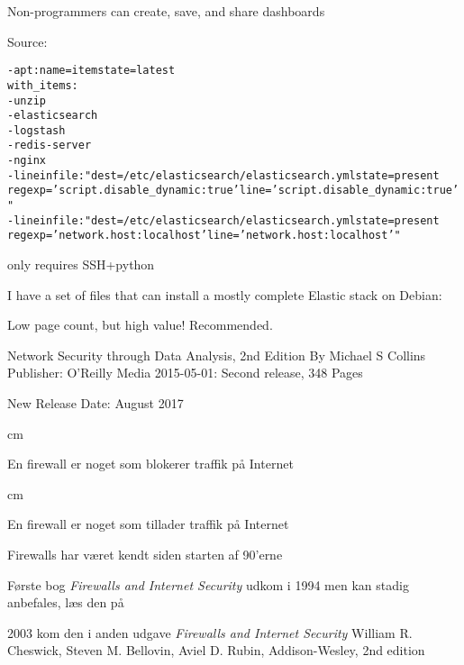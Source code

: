 \documentclass[Screen16to9,17pt]{foils}
\begin{document}
Non-programmers can create, save, and share dashboards

Source:




\begin{alltt}\small
- apt: name={{ item }} state=latest
  with_items:
        - unzip
        - elasticsearch
        - logstash
        - redis-server
        - nginx
- lineinfile: "dest=/etc/elasticsearch/elasticsearch.yml state=present
  regexp='script.disable_dynamic: true' line='script.disable_dynamic: true'"
- lineinfile: "dest=/etc/elasticsearch/elasticsearch.yml state=present
  regexp='network.host: localhost' line='network.host: localhost'"
\end{alltt}
\vskip 5mm
\centerline{only requires SSH+python }

I have a set of files that can install a mostly complete Elastic stack on Debian:\\



Low page count, but high value! Recommended.

Network Security through Data Analysis, 2nd Edition
By Michael S Collins
Publisher: O'Reilly Media
2015-05-01: Second release, 348 Pages

New Release Date: August 2017










 cm
\centerline{\hlkbig En firewall er noget som {\color{security6blue}blokerer}
  traffik på Internet}

 cm
\pause

\centerline{\hlkbig En firewall er noget som {\color{red}tillader}
  traffik på Internet}



\begin{list1}
\item Firewalls har været kendt siden starten af 90'erne
\item Første bog \emph{Firewalls and Internet Security} udkom i 1994 men kan stadig anbefales, læs den på 
\item 2003 kom den i anden udgave \emph{Firewalls and Internet Security}
William R. Cheswick, Steven M. Bellovin, Aviel D. Rubin,
Addison-Wesley, 2nd edition
\end{list1}
\end{document}
